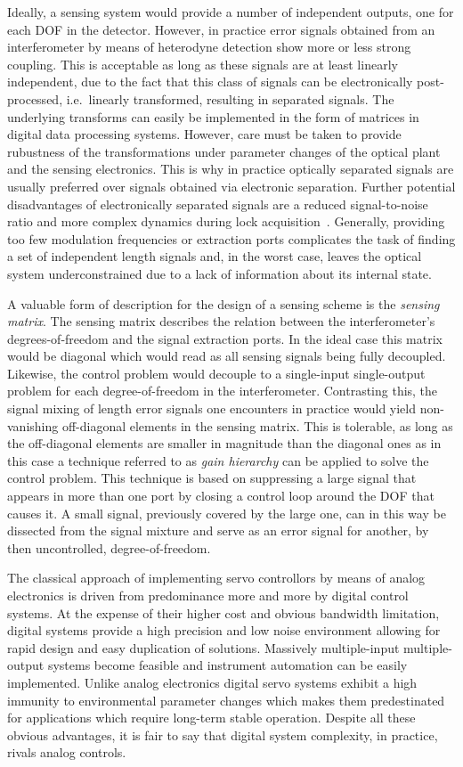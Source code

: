Ideally, a sensing system would provide a number of independent outputs, one for each DOF in the detector. However, in practice error signals
obtained from an interferometer by means of heterodyne detection show more or less strong coupling. 
This is acceptable as long as these signals are at least linearly independent, due to the fact that this class of signals can be electronically post-processed,
i.e.\ linearly transformed, resulting in separated signals. The underlying transforms can easily be implemented in the form of matrices in digital data processing systems. 
However, care must be taken to provide rubustness of the transformations under parameter changes of the optical plant and the sensing electronics. This is why in practice optically
separated signals are usually preferred over signals obtained via electronic separation. 
Further potential disadvantages of electronically separated signals are a reduced signal-to-noise ratio and more complex dynamics during lock acquisition~\cite{SKKKS07}.
Generally, providing too few modulation frequencies or extraction ports complicates the task of finding a set of independent length signals and, in the worst case,
leaves the optical system underconstrained due to a lack of information about its internal state.

A valuable form of description for the design of a sensing scheme is the \emph{sensing matrix}.
The sensing matrix describes the relation between the interferometer's degrees-of-freedom and the signal extraction ports. In the ideal case
this matrix would be diagonal which would read as all sensing signals being fully decoupled. Likewise, the control problem would decouple to a single-input single-output
problem for each degree-of-freedom in the interferometer. Contrasting this, the  signal mixing of length error signals one encounters in practice would yield non-vanishing off-diagonal elements in the sensing matrix.
This is tolerable, as long as the off-diagonal elements are smaller in magnitude than the diagonal ones as in this case a technique referred to as \emph{gain hierarchy}
can be applied to solve the control problem. This technique is based on suppressing a large signal that appears in more than one port by closing a control loop around the DOF that causes it. 
A small signal, previously covered by the large one, can in this way be dissected from the signal mixture and serve as an error signal for another, by then uncontrolled, degree-of-freedom. 

The classical approach of implementing servo controllors by means of analog electronics is driven from predominance more and more by digital control systems. At the expense of their higher cost and obvious bandwidth limitation,
digital systems provide a high precision and low noise environment allowing for rapid design and easy duplication of solutions. Massively multiple-input multiple-output systems become feasible and
instrument automation can be easily implemented. Unlike analog electronics digital servo systems exhibit a high immunity to environmental parameter changes which makes them predestinated for applications
which require long-term stable operation. Despite all these obvious advantages, it is fair to say that digital system complexity, in practice, rivals analog controls. 
\FloatBarrier
